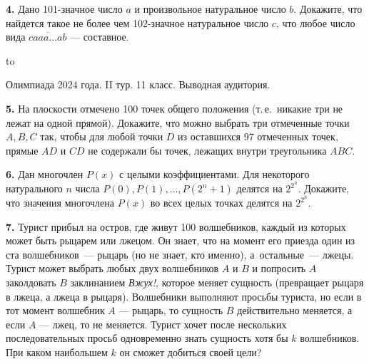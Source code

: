 \documentclass[12pt]{article}
\def\q#1.{{\bf #1. }}
\def\dotline{\smallskip\hbox to \hsize{\dotfill}\medskip}
\begin{document}
\q4. Дано 101-значное число $a$ и произвольное натуральное число $b$. Докажите, что найдется такое не более чем 102-значное натуральное число $c$, что любое число вида $\overline{caaa\ldots ab}$ --- составное.

\dotline

\centerline{Олимпиада 2024 года. II тур. 11 класс. Выводная аудитория.}
\smallskip

\q5. На плоскости отмечено 100 точек общего положения (т.\,е.\ никакие три не лежат на одной прямой). Докажите, что можно выбрать три отмеченные точки $A, B, C$ так, чтобы для любой точки $D$ из оставшихся 97 отмеченных точек, прямые $AD$ и $CD$ не содержали бы точек, лежащих внутри треугольника $ABC$.

\q6. Дан многочлен $P(x)$ с целыми коэффициентами. Для некоторого натурального $n$ числа $P(0), P(1), \ldots , P(2^n + 1)$ делятся на $2^{2^n}$. Докажите, что значения многочлена $P(x)$ во всех целых точках делятся на $2^{2^n}$.

\q7. Турист прибыл на остров, где живут 100 волшебников, каждый из которых может быть рыцарем или лжецом. Он знает, что на момент его приезда один из ста волшебников~--- рыцарь (но не знает, кто именно), а~остальные~--- лжецы. Турист может выбрать любых двух волшебников $A$ и $B$ и попросить $A$ заколдовать $B$ заклинанием \emph{Вжух!}, которое меняет сущность (превращает рыцаря в лжеца, а лжеца в рыцаря). Волшебники выполняют просьбы туриста, но если в тот момент волшебник $A$ --- рыцарь, то сущность $B$ действительно меняется, а если $A$ --- лжец, то не меняется. Турист хочет после нескольких последовательных просьб одновременно знать сущность хотя бы $k$ волшебников. При каком наибольшем $k$ он сможет добиться своей цели?
\end{document}
